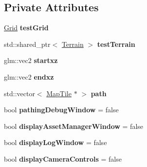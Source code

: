\subsection*{Private Attributes}
\begin{DoxyCompactItemize}
\item 
\mbox{\label{classpiolot_1_1_test_scene_aca94d51dc521dd620b45d85ee817cb0a}} 
\mbox{\hyperlink{classpiolot_1_1_grid}{Grid}} {\bfseries test\+Grid}
\item 
\mbox{\label{classpiolot_1_1_test_scene_a349626f35bec9409fa359108ce08c32e}} 
std\+::shared\+\_\+ptr$<$ \mbox{\hyperlink{classpiolot_1_1_terrain}{Terrain}} $>$ {\bfseries test\+Terrain}
\item 
\mbox{\label{classpiolot_1_1_test_scene_ab19142067d70aede9c5ac3cadecb1c29}} 
glm\+::vec2 {\bfseries startxz}
\item 
\mbox{\label{classpiolot_1_1_test_scene_aa7838a55b521b6d9c1d32dc3ca240ba7}} 
glm\+::vec2 {\bfseries endxz}
\item 
\mbox{\label{classpiolot_1_1_test_scene_a2a69831062ede8e0e0f889064b257d51}} 
std\+::vector$<$ \mbox{\hyperlink{classpiolot_1_1_map_tile}{Map\+Tile}} $\ast$ $>$ {\bfseries path}
\item 
\mbox{\label{classpiolot_1_1_test_scene_ac12dc2505449af346ebcead571fd2954}} 
bool {\bfseries pathing\+Debug\+Window} = false
\item 
\mbox{\label{classpiolot_1_1_test_scene_a7568d8b6dbe31cdac69303544c06d338}} 
bool {\bfseries display\+Asset\+Manager\+Window} = false
\item 
\mbox{\label{classpiolot_1_1_test_scene_a1abbac46b5984ea191e8f429cd10e626}} 
bool {\bfseries display\+Log\+Window} = false
\item 
\mbox{\label{classpiolot_1_1_test_scene_a91e97c2de25304b754313bd1beceecac}} 
bool {\bfseries display\+Camera\+Controls} = false
\item 

\end{DoxyCompactItemize}
